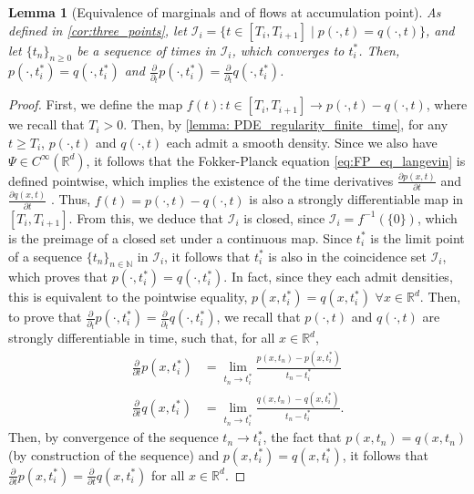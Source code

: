 \documentclass[twoside]{article}
\newcommand{\N}{\mathbb{N}}
\newcommand{\R} {\mathbb R}
\newtheorem{lemma}[theorem]{Lemma}
\begin{document}
\begin{lemma}[Equivalence of marginals and of flows at accumulation point] As defined in \cref{cor:three_points}, let $\mathcal{I}_i=\{t \in [T_i, T_{i+1}] \mid p(\cdot,t) = q(\cdot,t)\}$, and let $\{t_n\}_{n \ge 0}$ be a sequence of times in $\mathcal{I}_i$, which converges to $t_i^*$. Then, $p(\cdot, t_i^*)=q(\cdot, t_i^*)$ and $\frac{\partial}{\partial_t}p(\cdot, t_i^*) = \frac{\partial}{\partial_t} q(\cdot, t_i^*)$.
\label{lemma:flow_marginals_match}
\end{lemma}
\begin{proof}
First, we define the map $f(t):t \in [T_i, T_{i+1}]\to p(\cdot, t)-q(\cdot,t)$, where we recall that $T_i>0$. Then, by \cref{lemma: PDE_regularity_finite_time}, for any $t \ge T_i$, $p(\cdot, t)$ and $q(\cdot,t)$ each admit a smooth density. Since we also have $\Psi \in C^\infty(\R^d)$, it follows that the Fokker-Planck equation \eqref{eq:FP_eq_langevin} is defined pointwise, which implies the existence of the time derivatives $\frac{\partial p(x,t)}{\partial t}$ and $\frac{\partial q(x,t)}{\partial t}$ \citep[Theorem 4.1]{pavliotis2014stochastic}. Thus, $f(t)=p(\cdot,t)-q(\cdot,t)$ is also a strongly differentiable map in $[T_i,T_{i+1}]$. From this, we deduce that $\mathcal{I}_i$ is closed, since $\mathcal{I}_i=f^{-1}(\{0\})$, which is the preimage of a closed set under a continuous map. 
Since $t_i^*$ is the limit point of a sequence $\{t_n\}_{n \in \N}$ in $\mathcal{I}_i$, it follows that $t_i^*$ is also in the coincidence set $\mathcal{I}_i$, which proves that $p(\cdot, t_i^*) = q(\cdot, t_i^*)$. In fact, since they each admit densities, this is equivalent to the pointwise equality, $p(x, t_i^*) = q(x, t_i^*)$ $\forall x \in \R^d$. Then, to prove that $\frac{\partial}{\partial_t} p(\cdot, t_i^*) = \frac{\partial}{\partial_t} q(\cdot, t_i^*)$, we recall that $p(\cdot,t)$ and $q(\cdot,t)$ are strongly differentiable in time, such that, for all $x \in \R^d$,
\begin{align*}
    \frac{\partial}{\partial t} p(x,t_i^*) &= \lim\limits_{t_n \to t_i^*} \frac{p(x,t_n)-p(x,t_i^*)}{t_n-t_i^*}\\
    \frac{\partial}{\partial t} q(x,t_i^*) &= \lim\limits_{t_n \to t_i^*} \frac{q(x,t_n)-q(x,t_i^*)}{t_n-t_i^*}.
\end{align*}
Then, by convergence of the sequence $t_n \to t_i^*$, the fact that $p(x,t_n)=q(x,t_n)$ (by construction of the sequence) and $p(x,t_i^*)=q(x,t_i^*)$, it follows that $\frac{\partial}{\partial t} p(x,t_i^*) = \frac{\partial}{\partial t} q(x,t_i^*)$ for all $x \in \R^d$.
\end{proof}
\end{document}
